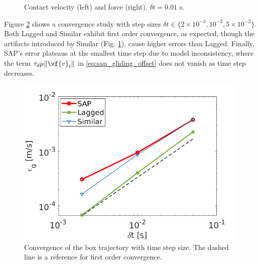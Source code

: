 \begin{figure}[!h]
    \centering
    \caption{\label{fig:belt_contact_velocity_and_force} Contact velocity (left)
    and force (right). $\delta t=0.01\text{ s}$.}
\end{figure}

Figure \ref{fig:bel_convergence_position} shows a convergence study with step
sizes $\delta t \in \{2\times10^{-3}, 10^{-2}, 5\times10^{-2}\}$. Both Lagged
and Similar exhibit first order convergence, as expected, though the artifacts
introduced by Similar (Fig. \ref{fig:belt_contact_velocity_and_force}), cause
higher errors than Lagged. Finally, SAP's error plateaus at the smallest time
step due to model inconsistency, where the term $\tau_d\mu\Vert\vf{v}_t\Vert$ in
\eqref{eq:sap_gliding_offset} does not vanish as time step decreases.

\begin{figure}[!h]
    \centering
    \includegraphics[width=0.8\columnwidth]{figures/TestCases/Belt/convergence_position.png}
    \caption{Convergence of the box trajectory with time step size. The dashed line is a reference for first order convergence.}
    \label{fig:bel_convergence_position}
\end{figure}
